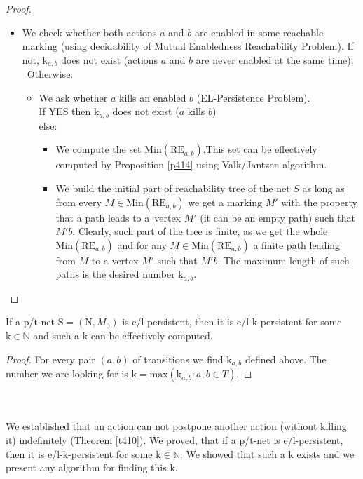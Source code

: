 \documentclass[a4paper]{llncs}
\begin{document}
\begin{proof}\
\begin{itemize}
\item We check whether both actions $a$ and $b$ are enabled in some reachable marking (using decidability of Mutual Enabledness Reachability Problem). If not, $\mathrm{k}_{a,b}$ does not exist (actions $a$ and $b$ are never enabled at the same time). \
Otherwise:
\begin{itemize}
\item We ask whether $a$ kills an enabled $b$ (EL-Persistence Problem).\\
If YES then $\mathrm{k}_{a,b}$ does not exist ($a$ kills $b$)\\
else:\
\begin{itemize}
\item We compute the set $\mathrm{Min}(\mathrm{RE}_{a,b})$.This set can be effectively computed by Proposition \ref{p414} using Valk/Jantzen algorithm.\
\item We build the initial part of reachability tree of the net $S$ as long as from every $M\in \mathrm{Min}(\mathrm{RE}_{a,b})$ we get a marking $M'$ with the property that a path leads to a~vertex $M'$ (it can be an empty path) such that $M'b$. Clearly, such part of the tree is finite, as we get the whole $\mathrm{Min}(\mathrm{RE}_{a,b})$ and for any $M\in \mathrm{Min}(\mathrm{RE}_{a,b})$ a finite path leading from $M$ to a vertex $M'$ such that $M'b$. The maximum length of such paths is the desired number $\mathrm{k}_{a,b}$. 	
\end{itemize}
\end{itemize}
\end{itemize}
\end{proof}

\begin{theorem}
\label{t420}
If a p/t-net $\mathrm{S}=(\mathrm{N},M_0)$ is e/l-persistent, then it is e/l-$\mathrm{k}$-persistent for some $\mathrm{k}\in \mathbb{N}$ and such a $\mathrm{k}$ can be effectively computed.
\end{theorem}

\begin{proof}
For every pair $(a,b)$ of transitions we find $\mathrm{k}_{a,b}$ defined above. The number we are looking for is $\mathrm{k}=\mathrm{max}(\mathrm{k}_{a,b}: a,b\in T)$. 	
\end{proof}
\mbox{ }\\ \\
We established that an action can not postpone another action (without killing it) indefinitely (Theorem \ref{t410}). We proved, that if a p/t-net is e/l-persistent, then it is e/l-k-persistent for some $\mathrm{k}\in \mathbb{N}$. We showed that such a k exists and we present any algorithm for finding this k. \\ \\
\end{document}
